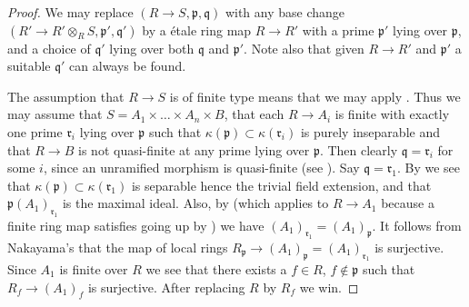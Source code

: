 \begin{proof}
We may replace $(R \to S, \mathfrak p, \mathfrak q)$
with any base change $(R' \to R'\otimes_R S, \mathfrak p', \mathfrak q')$
by a \'etale ring map $R \to R'$ with a prime $\mathfrak p'$
lying over $\mathfrak p$, and a choice of $\mathfrak q'$ lying over
both $\mathfrak q$ and $\mathfrak p'$. Note also that given
$R \to R'$ and $\mathfrak p'$ a suitable $\mathfrak q'$ can always
be found.

\medskip\noindent
The assumption that $R \to S$ is of finite type means that we may apply
. Thus we may
assume that $S = A_1 \times \ldots \times A_n \times B$, that
each $R \to A_i$ is finite with exactly one prime $\mathfrak r_i$
lying over $\mathfrak p$ such that
$\kappa(\mathfrak p) \subset \kappa(\mathfrak r_i)$ is purely inseparable
and that $R \to B$ is not quasi-finite at any prime lying over $\mathfrak p$.
Then clearly $\mathfrak q = \mathfrak r_i$ for some $i$, since
an unramified morphism is quasi-finite
(see ).
Say $\mathfrak q = \mathfrak r_1$.
By  we see that
$\kappa(\mathfrak p) \subset \kappa(\mathfrak r_1)$
is separable hence the trivial field extension, and that
$\mathfrak p(A_1)_{\mathfrak r_1}$ is the maximal ideal.
Also, by 
(which applies to $R \to A_1$ because a finite ring map satisfies going up by
)
we have $(A_1)_{\mathfrak r_1} = (A_1)_{\mathfrak p}$.
It follows from Nakayama's 
that the map of local rings
$R_{\mathfrak p} \to (A_1)_{\mathfrak p} = (A_1)_{\mathfrak r_1}$
is surjective. Since $A_1$ is finite over $R$ we see that there
exists a $f \in R$, $f \not \in \mathfrak p$ such that
$R_f \to (A_1)_f$ is surjective. After replacing $R$ by $R_f$ we win.
\end{proof}
